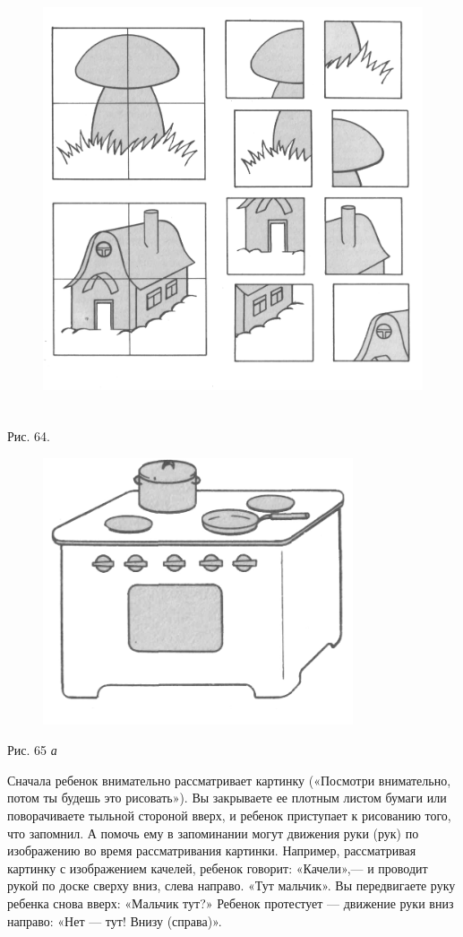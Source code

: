 \documentclass[a5paper]{book}
\renewcommand{\emph}[1]{\textit{#1}}
\begin{document}
\begin{figure}
\centering
\includegraphics[width=4.90972in,height=4.94306in]{media/media/image61.jpg}
\end{figure}

Рис. 64.

\begin{figure}
\centering
\includegraphics[width=3.60733in,height=3.10321in]{media/media/image62.jpg}
\end{figure}

Рис. 65 \emph{а}

Сначала ребенок внимательно рассматривает картинку («Посмотри
внимательно, потом ты будешь это рисовать»). Вы закрываете ее плотным
листом бумаги или поворачиваете тыльной стороной вверх, и ребенок
приступает к рисованию того, что запомнил. А помочь ему в запоминании
могут движения руки (рук) по изображению во время рассматривания
картинки. Например, рассматривая картинку с изображением качелей,
ребенок говорит: «Качели»,--- и проводит рукой по доске сверху вниз,
слева направо. «Тут мальчик». Вы передвигаете руку ребенка снова вверх:
«Мальчик тут?» Ребенок протестует --- движение руки вниз направо: «Нет
--- тут! Внизу (справа)».
\end{document}
